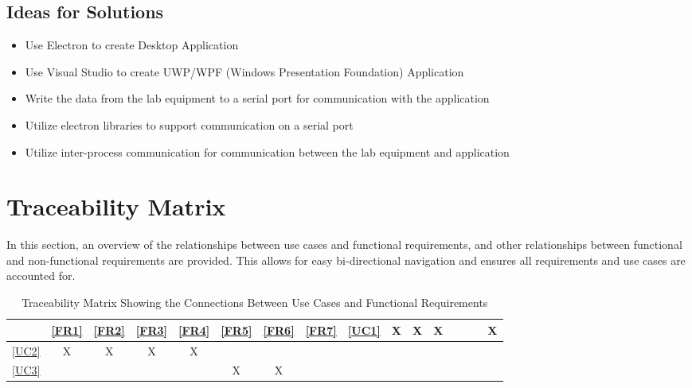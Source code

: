 \documentclass[12pt, titlepage]{article}
\begin{document}
\subsection{Ideas for Solutions}
\begin{itemize}
  \item Use Electron to create Desktop Application
  \item Use Visual Studio to create UWP/WPF (Windows Presentation Foundation) Application
  \item Write the data from the lab equipment to a serial port for communication with the application
  \item Utilize electron libraries to support communication on a serial port
  \item Utilize inter-process communication for communication between the lab equipment and application
\end{itemize}




%

\section{Traceability Matrix}
In this section, an overview of the relationships between use cases and functional requirements, and other relationships between functional and non-functional requirements are provided. This allows for easy bi-directional navigation and ensures all requirements and use cases are accounted for.

\begin{table}[h]
\centering
\begin{tabular}{|c|c|c|c|c|c|c|c|}
\hline        
	 & \ref{FR1} & \ref{FR2}& \ref{FR3} & \ref{FR4} & \ref{FR5}& \ref{FR6} & \ref{FR7} &
\hline
\ref{UC1}     & X & X & X & & & & X\\ \hline
\ref{UC2}     & X & X & X & X & & & \\ \hline
\ref{UC3}     &   &  &  &  & X & X &\\ \hline
\hline
\end{tabular}
\caption{Traceability Matrix Showing the Connections Between Use Cases and Functional Requirements}
\label{Table:trace}
\end{table}
\end{document}

